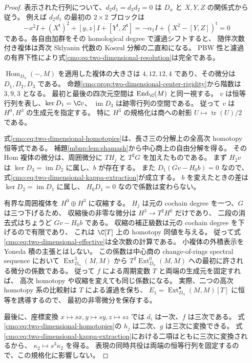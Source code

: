 \begin{proof}
表示された行列について、$d_2d_1=d_3d_2=0$ は
$D_\alpha$ と $X,Y,Z$ の関係式から従う。
例えば $d_2d_1$ の最初の $2\times2$ ブロックは
\[
 -x^2I+(X^{\mathsf t})^2+[y,z]I+[Y^{\mathsf t},Z^{\mathsf t}]
 =-\alpha_1I+(X^2-[Y,Z])^{\mathsf t}=0
\]
である。各自由加群をその homological degree で濾過シフトすると、
随伴次数付き複体は斉次 Sklyanin 代数の Koszul 分解の二直和になる。
PBW 性と濾過の有界下性により式\eqref{cmo:eq:two-dimensional-resolution}は完全である。

$\operatorname{Hom}_{D_\alpha}(-,M)$ を適用した複体の大きさは
$4,12,12,4$ であり、その微分は $D_1,D_2,D_3$ である。
命題\ref{cmo:prop:two-dimensional-center-rigidity}から階数は $3,9,3$ となる。
最初と最後の四次元空間は $\operatorname{End}_{\C}(M)$ と同一視する。
$v$ は恒等行列を表し、$\ker D_1=\C v$、
$\operatorname{im}D_3$ は跡零行列の空間である。
従って $v$ は $H^0,H^3$ の生成元を指定する。
特に $H^3$ の規格化は商への射影 $U\mapsto\operatorname{tr}(U)/2$ である。

式\eqref{cmo:eq:two-dimensional-homotopies}は、長さ三の分解上の全高次 homotopy 恒等式である。
補題\ref{mbnp:lem:shamash}から中心商上の自由分解を得る。
その Hom 複体の微分は、周囲微分に $TH_j$ と $T^2G$ を加えたものである。
まず $H_2v$ は $\ker D_3=\operatorname{im}D_2$ に属し、$b$ が存在する。
また $D_1(Gv-H_0b)=0$ なので、式\eqref{cmo:eq:two-dimensional-kappa-extraction}が成立する。
$b$ を変えたときの差は $\ker D_2=\operatorname{im}D_1$ に属し、
$H_0D_1=0$ なので係数は変わらない。

有界な周囲複体を $H^0\oplus H^3$ に収縮する。
$H_j$ は元の cochain degree を一つ、$G$ は三つ下げるため、
収縮後の非零な微分は $H^3\to T^2H^0$ だけであり、
二段の消去式はちょうど $Gv-H_0b$ である。
収縮の補正級数は元の cochain degree を下げるので有限であり、
これは $\C[T]$ 上の homotopy 同値を与える。
従って式\eqref{cmo:eq:two-dimensional-effective}は全次数の計算である。
小複体の外積表示を Yoneda 積の主張とはしない。
この係数は中心商の change-of-rings spectral sequence において
$\operatorname{Ext}^3_{D_\alpha}(M,M)$ から
$T^2\operatorname{Ext}^0_{D_\alpha}(M,M)$ への最初に許される微分の係数である。
従って $f$ による周期変数 $T$ と両端の生成元を固定すれば、
高次 homotopy や収縮を変えても同じ係数になる。
実際、二つの高次 homotopy 系の比較射は $T$ による濾過を保ち、
$E_1=\operatorname{Ext}_{D_\alpha}^{\bullet}(M,M)[T]$ に恒等を誘導するので、
最初の非零微分を保存する。

最後に、座標変換 $x\mapsto sx,y\mapsto sy,z\mapsto sz$ では
$d_i$ は一次、$f$ は三次である。
式\eqref{cmo:eq:two-dimensional-homotopies}の $h_j$ は二次、$g$ は三次に変換できる。
式\eqref{cmo:eq:two-dimensional-kappa-extraction}における二項はともに三次に変換されるから、
$\kappa_2\mapsto s^3\kappa_2$ を得る。
表現の同時共役は両端の恒等行列を固定するので、この規格化に影響しない。
\end{proof}

